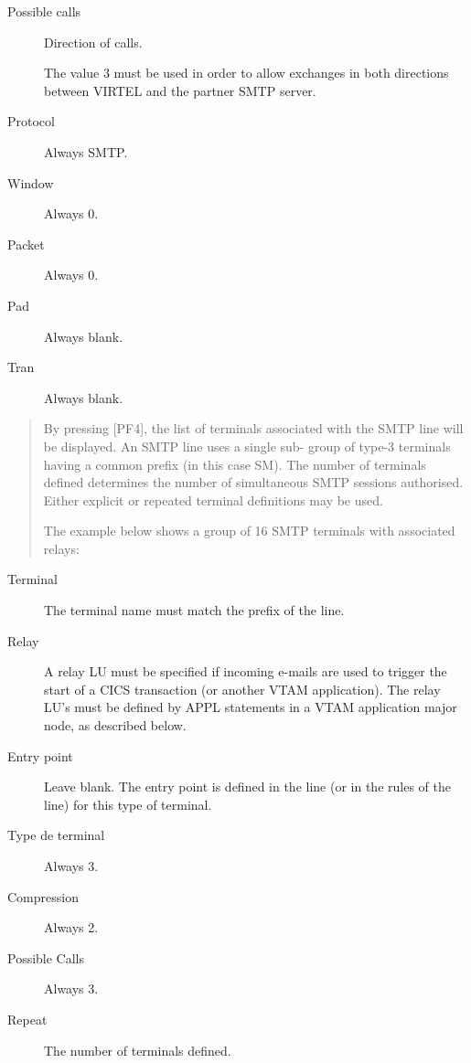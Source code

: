 \documentclass[letterpaper,10pt,english]{sphinxmanual}
\begin{document}
\begin{description}
\item[{Possible calls}] \leavevmode
Direction of calls.

The value 3 must be used in order to allow exchanges in both directions between VIRTEL and the partner SMTP server.

\item[{Protocol}] \leavevmode
Always SMTP.

\item[{Window}] \leavevmode
Always 0.

\item[{Packet}] \leavevmode
Always 0.

\item[{Pad}] \leavevmode
Always blank.

\item[{Tran}] \leavevmode
Always blank.

\end{description}

\begin{quote}

By pressing {[}PF4{]}, the list of terminals associated with the SMTP line will be displayed. An SMTP line uses a single sub- group of type-3 terminals having a common prefix (in this case SM). The number of terminals defined determines the number of simultaneous SMTP sessions authorised. Either explicit or repeated terminal definitions may be used.

The example below shows a group of 16 SMTP terminals with associated relays:
\end{quote}

\begin{description}
\item[{Terminal}] \leavevmode
The terminal name must match the prefix of the line.

\item[{Relay}] \leavevmode
A relay LU must be specified if incoming e-mails are used to trigger the start of a CICS transaction (or another VTAM application). The relay LU’s must be defined by APPL statements in a VTAM application major node, as described below.

\item[{Entry point}] \leavevmode
Leave blank. The entry point is defined in the line (or in the rules of the line) for this type of terminal.

\item[{Type de terminal}] \leavevmode
Always 3.

\item[{Compression}] \leavevmode
Always 2.

\item[{Possible Calls}] \leavevmode
Always 3.

\item[{Repeat}] \leavevmode
The number of terminals defined.

\end{description}
\end{document}
